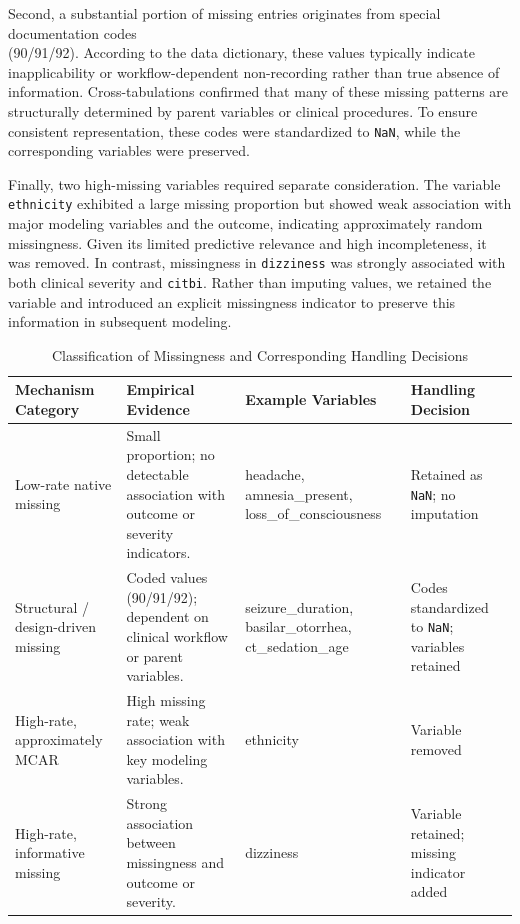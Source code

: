 \documentclass[11pt,letterpaper]{article}
\begin{document}
Second, a substantial portion of missing entries originates from special documentation codes \\ (90/91/92). According to the data dictionary, these values typically indicate inapplicability or workflow-dependent non-recording rather than true absence of information. Cross-tabulations confirmed that many of these missing patterns are structurally determined by parent variables or clinical procedures. To ensure consistent representation, these codes were standardized to \texttt{NaN}, while the corresponding variables were preserved.

Finally, two high-missing variables required separate consideration. The variable \texttt{ethnicity} exhibited a large missing proportion but showed weak association with major modeling variables and the outcome, indicating approximately random missingness. Given its limited predictive relevance and high incompleteness, it was removed. In contrast, missingness in \texttt{dizziness} was strongly associated with both clinical severity and \texttt{citbi}. Rather than imputing values, we retained the variable and introduced an explicit missingness indicator to preserve this information in subsequent modeling.


\begin{table}[ht]
\centering
\footnotesize
\renewcommand{\arraystretch}{1.5}

\caption{Classification of Missingness and Corresponding Handling Decisions}

\begin{tabularx}{\textwidth}{
    >{\raggedright\arraybackslash}p{3.3cm}
    >{\raggedright\arraybackslash}X
    >{\raggedright\arraybackslash}p{3.5cm}
    >{\raggedright\arraybackslash}p{3.2cm}
}
\toprule
\textbf{Mechanism Category} &
\textbf{Empirical Evidence} &
\textbf{Example Variables} &
\textbf{Handling Decision} \\
\midrule

Low-rate native missing &
Small proportion; no detectable association with outcome or severity indicators. &
headache, amnesia\_present, loss\_of\_consciousness &
Retained as \texttt{NaN}; no imputation \\

\addlinespace[6pt]

Structural / design-driven missing &
Coded values (90/91/92); dependent on clinical workflow or parent variables. &
seizure\_duration, basilar\_otorrhea, ct\_sedation\_age &
Codes standardized to \texttt{NaN}; variables retained \\

\addlinespace[6pt]

High-rate, approximately MCAR &
High missing rate; weak association with key modeling variables. &
ethnicity &
Variable removed \\

\addlinespace[6pt]

High-rate, informative missing &
Strong association between missingness and outcome or severity. &
dizziness &
Variable retained; missing indicator added \\

\bottomrule
\end{tabularx}
\end{table}
\end{document}
